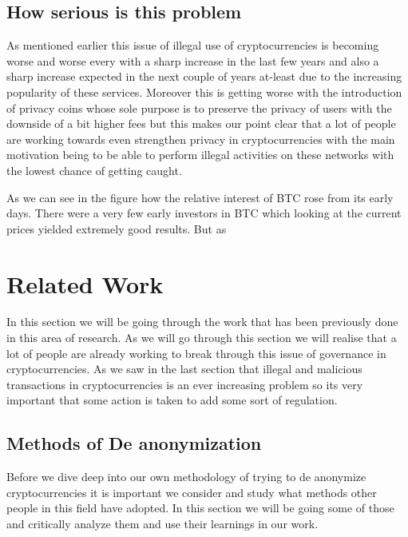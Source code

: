 \documentclass{article}
\begin{document}
\pagebreak

    \subsection{How serious is this problem}

        As mentioned earlier this issue of illegal use of cryptocurrencies is becoming worse and worse every with a sharp increase in the last few years and also a sharp increase expected in the next couple of years at-least due to the increasing popularity of these services. Moreover this is getting worse with the introduction of privacy coins whose sole purpose is to preserve the privacy of users with the downside of a bit higher fees but this makes our point clear that a lot of people are working towards even strengthen privacy in cryptocurrencies with the main motivation being to be able to perform illegal activities on these networks with the lowest chance of getting caught. 

        As we can see in the figure how the relative interest of BTC rose from its early days. There were a very few early investors in BTC which looking at the current prices yielded extremely good results. But as 

\cite{kethineni_cao_2019}

\pagebreak

\section{Related Work}
    
    In this section we will be going through the work that has been previously done in this area of research. As we will go through this section we will realise that a lot of people are already working to break through this issue of governance in cryptocurrencies. As we saw in the last section that illegal and malicious transactions in cryptocurrencies is an ever increasing problem so its very important that some action is taken to add some sort of regulation.


    \subsection{Methods of De anonymization}
        
        Before we dive deep into our own methodology of trying to de anonymize cryptocurrencies it is important we consider and study what methods other people in this field have adopted. In this section we will be going some of those and critically analyze them and use their learnings in our work.
        
\end{document}
